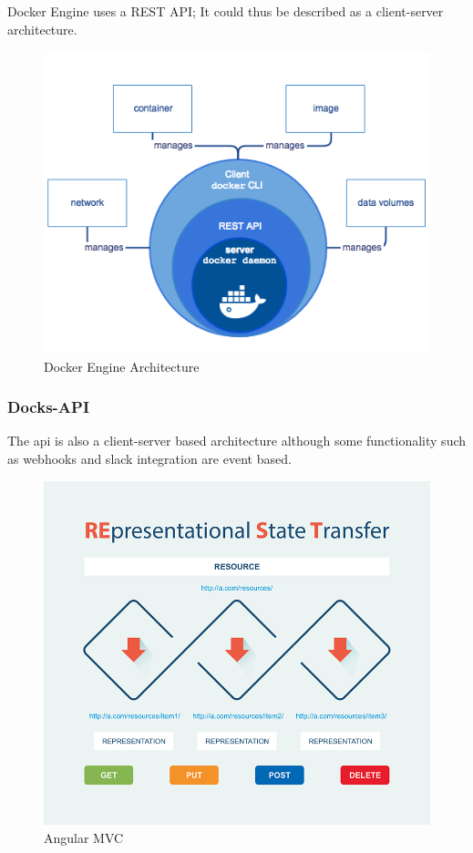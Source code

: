 \documentclass[]{article}
\begin{document}
Docker Engine uses a REST API; It could thus be described as a client-server architecture.

\begin{figure}[H]
	\centering
	\includegraphics[scale=0.5]{engine-components-flow.png}
	\caption{Docker Engine Architecture}
\end{figure}

\subsubsection{Docks-API}

The api is also a client-server based architecture although some functionality such as webhooks and slack integration are event based.

\begin{figure}[H]
	\centering
	\includegraphics[scale=0.5]{rest-working.png}
	\caption{Angular MVC}
\end{figure}
\end{document}
